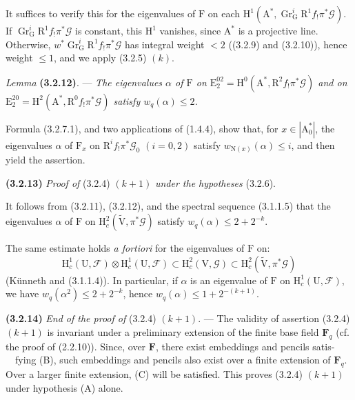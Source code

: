 \documentclass[11pt,leqno]{article}
\newcommand{\Page}[1]{\ifvmode\noindent\else\unskip\ \fi{\footnotesize\textcolor{gray}{[p.\,#1]}}\ \ignorespaces}
\begin{document}
It suffices to verify this for the eigenvalues of \(\mathrm{F}\) on each \(\mathrm{H}^1(\mathrm{A}^*,\operatorname{Gr}_{\mathrm{G}}^i\mathrm{R}^1f_!\pi^*\mathscr{G})\). If \(\operatorname{Gr}_{\mathrm{G}}^i\mathrm{R}^1f_!\pi^*\mathscr{G}\) is constant, this \(\mathrm{H}^1\) vanishes, since \(\mathrm{A}^*\) is a projective line. Otherwise, \(w^*\operatorname{Gr}_{\mathrm{G}}^i\mathrm{R}^1f_!\pi^*\mathscr{G}\) has integral weight \(<2\) ((3.2.9) and (3.2.10)), hence weight \(\leq1\), and we apply (3.2.5) \((k)\).

\textit{Lemma} \textbf{(3.2.12)}. — \textit{The eigenvalues \(\alpha\) of \(\mathrm{F}\) on \(\mathrm{E}_2^{02}=\mathrm{H}^0(\mathrm{A}^*,\mathrm{R}^2f_!\pi^*\mathscr{G})\) and on \(\mathrm{E}_2^{20}=\mathrm{H}^2(\mathrm{A}^*,\mathrm{R}^0f_!\pi^*\mathscr{G})\) satisfy \(w_q(\alpha)\leq2\).}

Formula (3.2.7.1), and two applications of (1.4.4), show that, for \(x\in|\mathrm{A}_0^*|\), the eigenvalues \(\alpha\) of \(\mathrm{F}_x\) on \(\mathrm{R}^if_!\pi^*\mathscr{G}_0\) \((i=0,2)\) satisfy \(w_{\mathrm{N}(x)}(\alpha)\leq i\), and then yield the assertion.

\textbf{(3.2.13)} \textit{Proof of} (3.2.4) \((k+1)\) \textit{under the hypotheses} (3.2.6).

It follows from (3.2.11), (3.2.12), and the spectral sequence (3.1.1.5) that the eigenvalues \(\alpha\) of \(\mathrm{F}\) on \(\mathrm{H}_c^2(\widetilde{\mathrm{V}},\pi^*\mathscr{G})\) satisfy \(w_q(\alpha)\leq2+2^{-k}\).

The same estimate holds \textit{a fortiori} for the eigenvalues of \(\mathrm{F}\) on:
\[
\mathrm{H}_c^1(\mathrm{U},\mathscr{F})\otimes
\mathrm{H}_c^1(\mathrm{U},\mathscr{F})
\subset\mathrm{H}_c^2(\mathrm{V},\mathscr{G})
\subset\mathrm{H}_c^2(\widetilde{\mathrm{V}},\pi^*\mathscr{G})
\]
(Künneth and (3.1.1.4)). In particular, if \(\alpha\) is an eigenvalue of \(\mathrm{F}\) on \(\mathrm{H}_c^1(\mathrm{U},\mathscr{F})\), we have \(w_q(\alpha^2)\leq2+2^{-k}\), hence \(w_q(\alpha)\leq1+2^{-(k+1)}\).

\textbf{(3.2.14)} \textit{End of the proof of} (3.2.4) \((k+1)\). — The validity of assertion (3.2.4) \((k+1)\) is invariant under a preliminary extension of the finite base field \(\mathbf{F}_q\) (cf. the proof of (2.2.10)). Since, over \(\mathbf{F}\), there exist embeddings and pencils satis-\Page{204}fying (B), such embeddings and pencils also exist over a finite extension of \(\mathbf{F}_q\). Over a larger finite extension, (C) will be satisfied. This proves (3.2.4) \((k+1)\) under hypothesis (A) alone.
\end{document}
